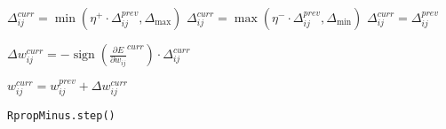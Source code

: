 \begin{algorithm}
    \BlankLine
    \BlankLine

     { \BlankLine
         { \BlankLine
            $\Delta_{ij}^{curr} = \min(\eta^{+} \cdot \Delta_{ij}^{prev}, \Delta_{\max})$
        }
         { \BlankLine
            $\Delta_{ij}^{curr} = \max(\eta^{-} \cdot \Delta_{ij}^{prev}, \Delta_{\min})$
        }
         { \BlankLine
            $\Delta_{ij}^{curr} = \Delta_{ij}^{prev}$
        } \BlankLine

        $\Delta w_{ij}^{curr} = -\operatorname{sign}\left(\frac{\partial E}{\partial w_{ij}}^{curr}\right) \cdot \Delta_{ij}^{curr}$ \BlankLine

        $w_{ij}^{curr} = w_{ij}^{prev} + \Delta w_{ij}^{curr}$
    }

    \caption{\texttt{RpropMinus.step()}}
    \label{alg:rpropminus}
\end{algorithm}